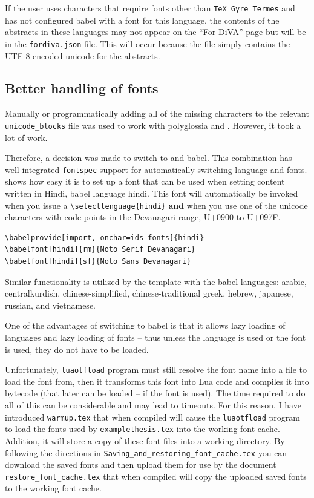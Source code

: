 \documentclass[12pt, twoside]{article}
\newcommand{\fname}[1]{\texttt{#1}}
\begin{document}
\FloatBarrier


If the user uses characters that require fonts other than \texttt{TeX Gyre Termes} and has not configured babel with a font for this language, the contents of the abstracts in these languages may not appear on the \enquote{For DiVA} page but will be in the \fname{fordiva.json} file. This will occur because the file simply contains the UTF-8 encoded unicode for the abstracts.

\subsection{Better handling of fonts}
\label{sec:BetterHandlingOfFonts}

Manually or programmatically adding all of the missing characters to the relevant \texttt{unicode\_blocks} file was used to work with polyglossia and \XeLaTeX{}. However, it took a lot of work.

Therefore, a decision was made to switch to \LuaLaTeX{} and babel. This combination has well-integrated \texttt{fontspec} support for automatically switching language and fonts.  shows how easy it is to set up a font that can be used when setting content written in Hindi, \ie babel language hindi. This font will automatically be invoked when you issue a \texttt{\textbackslash selectlenguage\{hindi\}} \textbf{and} when you use one of the unicode characters with code points in the Devanagari range, \ie U+0900 to U+097F.

\begin{lstlisting}[language={[LaTeX]TeX}, caption={Establishing fonts to be used when setting content in Hindi}, label=lst:BabelHindiExample] 
\babelprovide[import, onchar=ids fonts]{hindi}
\babelfont[hindi]{rm}{Noto Serif Devanagari}
\babelfont[hindi]{sf}{Noto Sans Devanagari}
\end{lstlisting}

Similar functionality is utilized by the template with the babel languages: arabic, centralkurdish, chinese-simplified, chinese-traditional greek, hebrew, japanese, russian, and vietnamese.

One of the advantages of switching to babel is that it allows lazy loading of languages and lazy loading of fonts -- thus unless the language is used or the font is used, they do not have to be loaded.

Unfortunately, \texttt{luaotfload} program must still resolve the font name into a file to load the font from, then it transforms this font into Lua code and compiles it into bytecode (that later can be loaded -- if the font is used). The time required to do all of this can be considerable and may lead to timeouts. For this reason, I have introduced \fname{warmup.tex} that when compiled will cause the \texttt{luaotfload} program to load the fonts used by \fname{examplethesis.tex} into the working font cache. Addition, it will store a copy of these font files into a working directory. By following the directions in \fname{Saving\_and\_restoring\_font\_cache.tex} you can download the saved fonts and then upload them for use by the document \fname{restore\_font\_cache.tex} that when compiled will copy the uploaded saved fonts to the working font cache.
\end{document}
